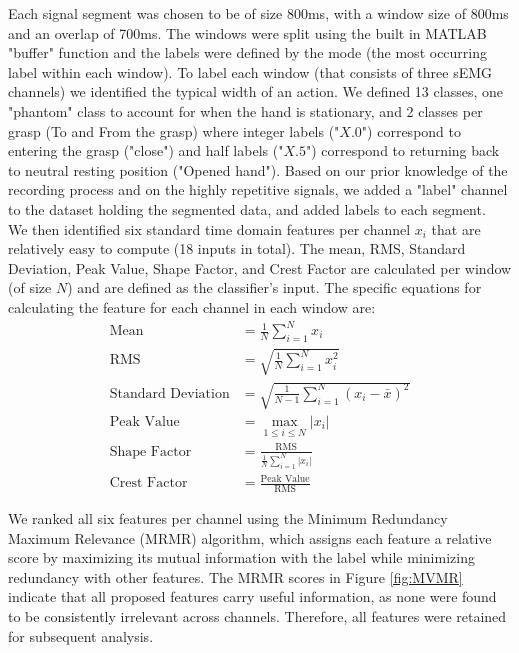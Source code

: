 \documentclass[10pt]{article}
\begin{document}
Each signal segment was chosen to be of size 800ms, with a window size of 800ms and an overlap of 700ms. The windows were split using the built in MATLAB "buffer" function and the labels were defined by the mode (the most occurring label within each window). To label each window (that consists of three sEMG channels) we identified the typical width of an action. We defined 13 classes, one "phantom" class to account for when the hand is stationary, and 2 classes per grasp (To and From the grasp) where integer labels ("$X.0$") correspond to entering the grasp ("close") and half labels ("$X.5$") correspond to returning back to neutral resting position ("Opened hand"). Based on our prior knowledge of the recording process and on the highly repetitive signals, we added a "label" channel to the dataset holding the segmented data, and added labels to each segment.\\ 
We then identified six standard time domain features per channel $x_i$ that are relatively easy to compute (18 inputs in total). The mean, RMS, Standard Deviation, Peak Value, Shape Factor, and Crest Factor are calculated per window (of size $N$) and are defined as the classifier's input. The specific equations for calculating the feature for each channel in each window are:
\begin{equation}
\begin{aligned}
\text{Mean} &= \frac{1}{N}\sum_{i=1}^N x_i \\
\text{RMS} &= \sqrt{\frac{1}{N}\sum_{i=1}^N x_i^2} \\
\text{Standard Deviation} &= \sqrt{\frac{1}{N-1}\sum_{i=1}^N (x_i - \bar{x})^2} \\
\text{Peak Value} &= \max_{1 \leq i \leq N} |x_i| \\
\text{Shape Factor} &= \frac{\text{RMS}}{\tfrac{1}{N}\sum_{i=1}^N |x_i|} \\
\text{Crest Factor} &= \frac{\text{Peak Value}}{\text{RMS}}
\end{aligned}
\end{equation}

We ranked all six features per channel using the Minimum Redundancy Maximum Relevance (MRMR) algorithm, which assigns each feature a relative score by maximizing its mutual information with the label while minimizing redundancy with other features. The MRMR scores in Figure \ref{fig:MVMR} indicate that all proposed features carry useful information, as none were found to be consistently irrelevant across channels. Therefore, all features were retained for subsequent analysis.
\end{document}
